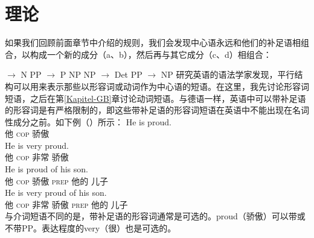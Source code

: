 \section{\xbar 理论}
\label{sec-xbar}

如果我们回顾前面章节中介绍的规则，我们会发现中心语永远和他们的补足语相组合，以构成一个新的成分（a、b），然后再与其它成分（c、d）相组合：

\eal
\ex \nbar $\to$ N PP
\ex \pbar $\to$ P NP
\ex\label{Regel-NP-Xbar}
    NP $\to$ Det \nbar
\ex PP $\to$ NP \pbar
\zl
%
研究英语的语法学家发现，平行结构可以用来表示那些以形容词或动词作为中心语的短语。在这里，我先讨论形容词短语，之后在第\ref{Kapitel-GB}章讨论动词短语。与德语一样，英语中可以带补足语的形容词是有严格限制的，即这些带补足语的形容词短语在英语中不能出现在名词性成分之前。如下例（）所示：
\eal
\ex 
\gll He is proud.\\
     他 \textsc{cop} 骄傲\\
\ex 
\gll He is very proud.\\
他 \textsc{cop} 非常 骄傲\\
\ex 
\gll He is proud of his son.\\
他 \textsc{cop} 骄傲 \textsc{prep} 他的 儿子\\
\ex 
\gll He is very proud of his son.\\
他 \textsc{cop} 非常 骄傲 \textsc{prep} 他的 儿子\\
\zl
与介词短语不同的是，带补足语的形容词通常是可选的。proud（骄傲）可以带或不带PP。表达程度的very（很）也是可选的。

